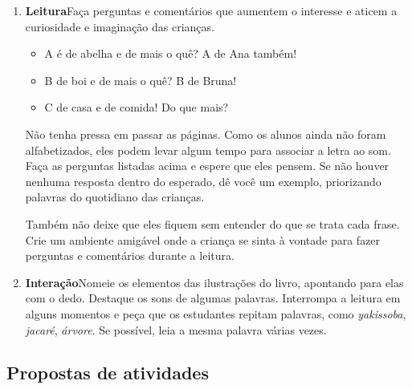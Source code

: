 \documentclass[11pt]{extarticle}
\begin{document}
\begin{enumerate}
\item \textbf{Leitura}\quad Faça perguntas e comentários que aumentem o 
interesse e aticem a curiosidade e imaginação das crianças. 

\begin{itemize}
\item A é de abelha e de mais o quê? A de Ana também!
\item B de boi e de mais o quê? B de Bruna!
\item C de casa e de comida! Do que mais?
\end{itemize}

Não tenha pressa em passar as páginas. Como os alunos ainda não foram 
alfabetizados, eles podem levar algum tempo para associar a letra
ao som. Faça as perguntas listadas acima e espere que eles 
pensem. Se não houver nenhuma resposta dentro do esperado,
dê você um exemplo, priorizando palavras do quotidiano das crianças.

Também não deixe que eles fiquem sem entender do que se trata cada frase. Crie 
um ambiente amigável onde a criança se sinta à vontade para fazer 
perguntas e comentários durante a leitura.






\item \textbf{Interação}\quad Nomeie os elementos das ilustrações 
do livro, apontando para elas com o dedo. Destaque os sons de algumas 
palavras. Interrompa a leitura em alguns momentos e peça que 
os estudantes repitam palavras, como \textit{yakissoba}, \textit{jacaré}, \textit{árvore}. Se possível, 
leia a mesma palavra várias vezes.
\end{enumerate}


\subsection{Propostas de atividades}

\end{document}
